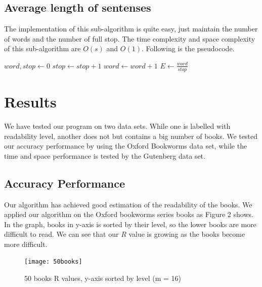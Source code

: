 \documentclass{article}
\begin{document}
        \subsection{Average length of sentenses}
			The implementation of this sub-algorithm is quite easy, just maintain the number of words and the number of full stop.
			The time complexity and space complexity of this sub-algorithm are $O(s)$ and $O(1)$. Following is the pseudocode.
                \begin{center}
                \begin{algorithmic}
                                \State $word, stop \gets 0$
                                                \State $stop \gets stop + 1$
                                        \Else
                                                        \State $word \gets word + 1$
                                                \EndIf
                                        \EndIf
                                \EndFor
                                \State \Return $E \gets \frac{word}{stop}$
                        \EndFunction
                \end{algorithmic}
                \end{center}


\section{Results}
We have tested our program on two data sets. While one is labelled with readability level, another does not but contains a big number of books. We tested our accuracy performance by using the Oxford Bookworms data set, while the time and space performance is tested by the Gutenberg data set.
\subsection{Accuracy Performance}
Our algorithm has achieved good estimation of the readability of the books. We applied our algorithm on the Oxford bookworms series books as Figure 2 shows. In the graph, books in y-axis is sorted by their level, so the lower books are more difficult to read. We can see that our $R$ value is growing as the books become more difficult.
\begin{figure}[H]
\begin{center}
\texttt{[image: 50books]} 
\caption{50 books R values, y-axis sorted by level (m = 16)}
\end{center}
\end{figure}
\end{document}
